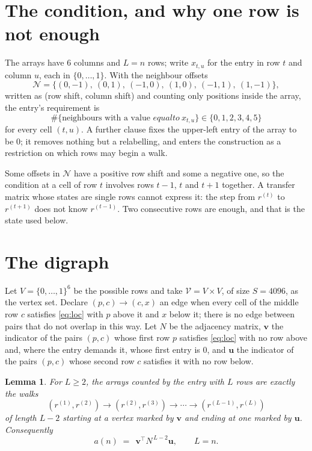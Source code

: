 \documentclass[11pt,a4paper]{article}
\theoremstyle{plain}
\newtheorem{lemma}[theorem]{Lemma}
\theoremstyle{definition}
\begin{document}
\section{The condition, and why one row is not enough}

The arrays have $6$ columns and $L=n$ rows; write $x_{t,u}$ for the entry in
row $t$ and column $u$, each in $\{0,\dots,1\}$. With the neighbour offsets
\[
\mathcal N=\{(0,-1),\ (0,1),\ (-1,0),\ (1,0),\ (-1,1),\ (1,-1)\},
\]
written as (row shift, column shift) and counting only positions inside the array, the
entry's requirement is
\begin{equation}\label{eq:loc}
\#\{\text{neighbours with a value }equal to\ x_{t,u}\}\in\{0,1,2,3,4,5\}
\end{equation}
for every cell $(t,u)$. A further clause fixes the upper-left entry of the array to be $0$; it removes nothing but a relabelling, and enters the construction as a restriction on which rows may begin a walk.

Some offsets in $\mathcal N$ have a positive row shift and some a negative one, so the
condition at a cell of row $t$ involves rows $t-1$, $t$ and $t+1$ together. A transfer
matrix whose states are single rows cannot express it: the step from $r^{(t)}$ to
$r^{(t+1)}$ does not know $r^{(t-1)}$. Two consecutive rows are enough, and that is
the state used below.

\section{The digraph}

Let $V=\{0,\dots,1\}^{6}$ be the possible rows and take
$\mathcal V=V\times V$, of size $S=4096$, as the vertex set. Declare $(p,c)\to(c,x)$ an edge
when every cell of the middle row $c$ satisfies \eqref{eq:loc} with $p$ above it and $x$
below it; there is no edge between pairs that do not overlap in this way. Let $N$ be the
adjacency matrix, $\mathbf{v}$ the indicator of the pairs $(p,c)$ whose first row $p$
satisfies \eqref{eq:loc} with no row above and, where the entry demands it, whose first entry is $0$, and $\mathbf{u}$ the indicator of
the pairs $(p,c)$ whose second row $c$ satisfies it with no row below.

\begin{lemma}\label{lem:walk}
For $L\ge2$, the arrays counted by the entry with $L$ rows are exactly the walks
\[
(r^{(1)},r^{(2)})\to(r^{(2)},r^{(3)})\to\cdots\to(r^{(L-1)},r^{(L)})
\]
of length $L-2$ starting at a vertex marked by $\mathbf{v}$ and ending at one marked by
$\mathbf{u}$. Consequently
\[
a(n)\;=\;\,\mathbf{v}^{\!\top}N^{\,L-2}\mathbf{u},\qquad L=n .
\]
\end{lemma}
\end{document}
